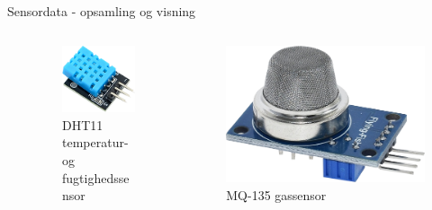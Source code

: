\documentclass[aspectratio=169]{beamer}
\begin{document}
\begin{frame}{Sensordata - opsamling og visning}
\begin{columns}
\begin{column}{0.6\textwidth}
\begin{textBox}
\begin{itemize}
\begin{itemize}
\begin{itemize}
					\end{itemize}
				\end{itemize}
			\end{itemize}
		\end{textBox}
	\end{column}
	\begin{column}{0.4\textwidth}
		\centering
		\captionsetup{format=tcbcaptionsmall}
		\begin{columns}
			\begin{column}{0.45\textwidth}
				\begin{figure}[height=0.2\textheight]
  					\includegraphics[height=0.2\textheight,keepaspectratio=true]{assets/pictures/dht11.png}
  					\caption{DHT11 temperatur- og fugtighedssensor}
  					\label{fig:dht11}
				\end{figure}
			\end{column}
			\begin{column}{0.45\textwidth}
				\begin{figure}[height=0.2\textheight]
  					\includegraphics[height=0.2\textheight,keepaspectratio=true]{assets/pictures/mq-135.png}
  					\caption{MQ-135 gassensor}
  					\label{fig:mq-135}

\end{figure}
\end{column}
\end{columns}
\end{column}
\end{columns}
\end{frame}
\end{document}
